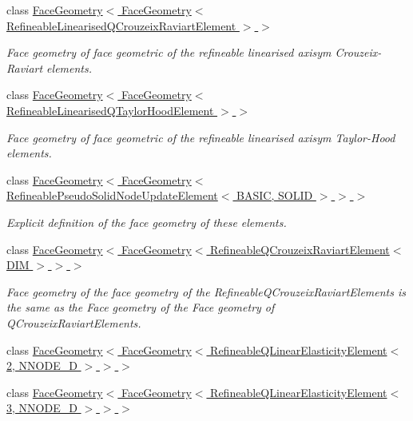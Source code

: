\begin{DoxyCompactItemize}
class \hyperlink{classoomph_1_1FaceGeometry_3_01FaceGeometry_3_01RefineableLinearisedQCrouzeixRaviartElement_01_4_01_4}{Face\+Geometry$<$ Face\+Geometry$<$ Refineable\+Linearised\+Q\+Crouzeix\+Raviart\+Element $>$ $>$}
\begin{DoxyCompactList}\small\item\em Face geometry of face geometric of the refineable linearised axisym Crouzeix-\/\+Raviart elements. \end{DoxyCompactList}\item 
class \hyperlink{classoomph_1_1FaceGeometry_3_01FaceGeometry_3_01RefineableLinearisedQTaylorHoodElement_01_4_01_4}{Face\+Geometry$<$ Face\+Geometry$<$ Refineable\+Linearised\+Q\+Taylor\+Hood\+Element $>$ $>$}
\begin{DoxyCompactList}\small\item\em Face geometry of face geometric of the refineable linearised axisym Taylor-\/\+Hood elements. \end{DoxyCompactList}\item 
class \hyperlink{classoomph_1_1FaceGeometry_3_01FaceGeometry_3_01RefineablePseudoSolidNodeUpdateElement_3_01BASIC_00_01SOLID_01_4_01_4_01_4}{Face\+Geometry$<$ Face\+Geometry$<$ Refineable\+Pseudo\+Solid\+Node\+Update\+Element$<$ B\+A\+S\+I\+C, S\+O\+L\+I\+D $>$ $>$ $>$}
\begin{DoxyCompactList}\small\item\em Explicit definition of the face geometry of these elements. \end{DoxyCompactList}\item 
class \hyperlink{classoomph_1_1FaceGeometry_3_01FaceGeometry_3_01RefineableQCrouzeixRaviartElement_3_01DIM_01_4_01_4_01_4}{Face\+Geometry$<$ Face\+Geometry$<$ Refineable\+Q\+Crouzeix\+Raviart\+Element$<$ D\+I\+M $>$ $>$ $>$}
\begin{DoxyCompactList}\small\item\em Face geometry of the face geometry of the Refineable\+Q\+Crouzeix\+Raviart\+Elements is the same as the Face geometry of the Face geometry of Q\+Crouzeix\+Raviart\+Elements. \end{DoxyCompactList}\item 
class \hyperlink{classoomph_1_1FaceGeometry_3_01FaceGeometry_3_01RefineableQLinearElasticityElement_3_012_00_01NNODE__1D_01_4_01_4_01_4}{Face\+Geometry$<$ Face\+Geometry$<$ Refineable\+Q\+Linear\+Elasticity\+Element$<$ 2, N\+N\+O\+D\+E\+\_\+D $>$ $>$ $>$}
\item 
class \hyperlink{classoomph_1_1FaceGeometry_3_01FaceGeometry_3_01RefineableQLinearElasticityElement_3_013_00_01NNODE__1D_01_4_01_4_01_4}{Face\+Geometry$<$ Face\+Geometry$<$ Refineable\+Q\+Linear\+Elasticity\+Element$<$ 3, N\+N\+O\+D\+E\+\_\+D $>$ $>$ $>$}

\end{DoxyCompactItemize}
